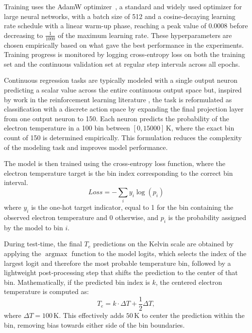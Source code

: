 \documentclass{agujournal2019}
\begin{document}
Training uses the AdamW optimizer~\citep{loshchilov_decoupled_2019}, a standard and widely used optimizer for large neural networks, with a batch size of 512 and a cosine-decaying learning rate schedule with a linear warm-up phase, reaching a peak value of \( 0.0008 \) before decreasing to \( \frac{1}{1000} \) of the maximum learning rate. These hyperparameters are chosen empirically based on what gave the best performance in the experiments. Training progress is monitored by logging cross-entropy loss on both the training set and the continuous validation set at regular step intervals across all epochs.

Continuous regression tasks are typically modeled with a single output neuron predicting a scalar value across the entire continuous output space but, inspired by work in the reinforcement learning literature \citep{tang_discretizing_2020}, the task is reformulated as classification with a discrete action space by expanding the final projection layer from one output neuron to 150. Each neuron predicts the probability of the electron temperature in a 100  bin between \( [0, 15000] \, \text{K} \), where the exact bin count of 150 is determined empirically. This formulation reduces the complexity of the modeling task and improves model performance.

The model is then trained using the cross-entropy loss function, where the electron temperature target is the bin index corresponding to the correct bin interval.
\begin{equation}
Loss = - \sum_{i} y_i \log(p_i)
\end{equation}
where $y_i$ is the one-hot target indicator, equal to 1 for the bin containing the observed electron temperature and 0 otherwise, and $p_i$ is the probability assigned by the model to bin $i$.

During test-time, the final $T_e$ predictions on the Kelvin scale are obtained by applying the $\operatorname{argmax}$ function to the model logits, which selects the index of the largest logit and therefore the most probable temperature bin, followed by a lightweight post-processing step that shifts the prediction to the center of that bin. Mathematically, if the predicted bin index is $k$, the centered electron temperature is computed as:
\begin{equation}
T_e = k \cdot \Delta T + \frac{1}{2} \Delta T,
\end{equation}
where $\Delta T = 100 \, \text{K}$. This effectively adds $50 \, \text{K}$ to center the prediction within the bin, removing bias towards either side of the bin boundaries.
\end{document}
